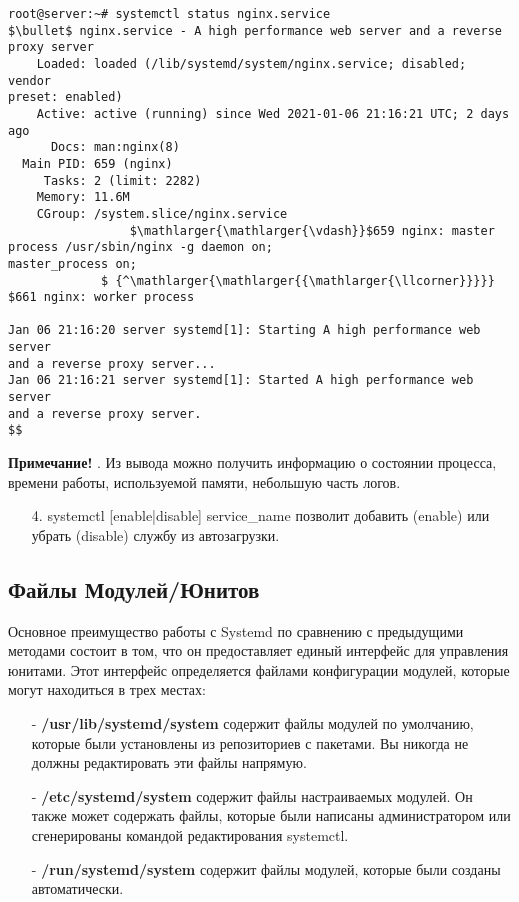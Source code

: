 \documentclass[14pt, a4paper]{article}
\begin{document}
\begin{lstlisting}
root@server:~# systemctl status nginx.service
$\bullet$ nginx.service - A high performance web server and a reverse proxy server
    Loaded: loaded (/lib/systemd/system/nginx.service; disabled; vendor 
preset: enabled)
    Active: active (running) since Wed 2021-01-06 21:16:21 UTC; 2 days ago
      Docs: man:nginx(8)
  Main PID: 659 (nginx)
     Tasks: 2 (limit: 2282)
    Memory: 11.6M
    CGroup: /system.slice/nginx.service
                 $\mathlarger{\mathlarger{\vdash}}$659 nginx: master process /usr/sbin/nginx -g daemon on;
master_process on;
             $ {^\mathlarger{\mathlarger{{\mathlarger{\llcorner}}}}} $661 nginx: worker process

Jan 06 21:16:20 server systemd[1]: Starting A high performance web server 
and a reverse proxy server...
Jan 06 21:16:21 server systemd[1]: Started A high performance web server 
and a reverse proxy server.
$$
\end{lstlisting}

\vspace{0.2cm}

\noindent \textbf{Примечание!} . Из вывода можно
получить информацию о состоянии процесса, времени работы, используемой памяти,
небольшую часть логов.

\begin{enumerate}
    \item[4.] \colorbox{backcolour}{systemctl [enable|disable] service\_name} позволит добавить (enable) или убрать
    (disable) службу из автозагрузки.
\end{enumerate}

\subsection*{Файлы Модулей/Юнитов} 

Основное преимущество работы с Systemd по сравнению с предыдущими методами состоит в том,
что он предоставляет единый интерфейс для управления юнитами. Этот интерфейс определяется
файлами конфигурации модулей, которые могут находиться в трех местах:

\begin{itemize}
    \item[-] \textbf{/usr/lib/systemd/system} содержит файлы модулей по умолчанию, которые были установлены
    из репозиториев с пакетами. Вы никогда не должны редактировать эти файлы напрямую.
    \item[-] \textbf{/etc/systemd/system} содержит файлы настраиваемых модулей. Он также может содержать
    файлы, которые были написаны администратором или сгенерированы командой
    редактирования systemctl.
    \item[-] \textbf{/run/systemd/system} содержит файлы модулей, которые были созданы автоматически.
\end{itemize}
\end{document}
